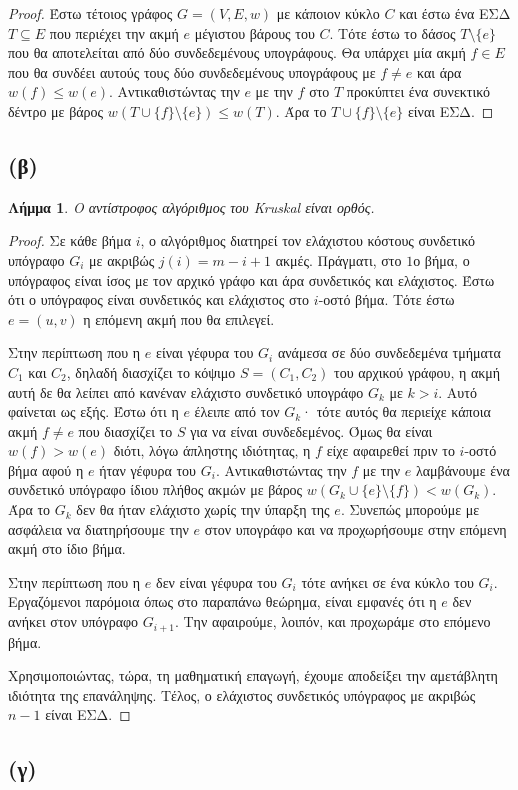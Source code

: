 \documentclass[11pt,a4paper]{book}
\newtheorem*{lemma}{Λήμμα}
\begin{document}
\begin{proof}
Έστω τέτοιος γράφος $G = (V, E, w)$ με κάποιον κύκλο $C$ και έστω ένα ΕΣΔ $T \subseteq E$ που περιέχει την ακμή $e$ μέγιστου βάρους του $C$. Τότε έστω το δάσος $T \setminus \{ e \}$ που θα αποτελείται από δύο συνδεδεμένους υπογράφους. Θα υπάρχει μία ακμή $f \in E$ που θα συνδέει αυτούς τους δύο συνδεδεμένους υπογράφους με $f \neq e$ και άρα $w( f ) \leq w( e )$. Αντικαθιστώντας την $e$ με την $f$ στο $T$ προκύπτει ένα συνεκτικό δέντρο με βάρος $w( T \cup \{ f \} \setminus \{ e \} ) \leq w( T )$. Άρα το $T \cup \{ f \} \setminus \{ e \}$ είναι ΕΣΔ.
\end{proof}

\subsection*{(β)}
\begin{lemma}
Ο αντίστροφος αλγόριθμος του \textlatin{Kruskal} είναι ορθός.
\end{lemma}

\begin{proof}
Σε κάθε βήμα $i$, ο αλγόριθμος διατηρεί τον ελάχιστου κόστους συνδετικό υπόγραφο $G_i$ με ακριβώς $j(i) = m - i + 1$ ακμές. Πράγματι, στο $1$ο βήμα, ο υπόγραφος είναι ίσος με τον αρχικό γράφο και άρα συνδετικός και ελάχιστος. Έστω ότι ο υπόγραφος είναι συνδετικός και ελάχιστος στο $i$-οστό βήμα. Τότε έστω $e = (u, v)$ η επόμενη ακμή που θα επιλεγεί.

Στην περίπτωση που η $e$ είναι γέφυρα του $G_i$ ανάμεσα σε δύο συνδεδεμένα τμήματα $C_1$ και $C_2$, δηλαδή διασχίζει το κόψιμο $S = ( C_1, C_2 )$ του αρχικού γράφου, η ακμή αυτή δε θα λείπει από κανέναν ελάχιστο συνδετικό υπογράφο $G_k$ με $k > i$. Αυτό φαίνεται ως εξής. Έστω ότι η $e$ έλειπε από τον $G_k$· τότε αυτός θα περιείχε κάποια ακμή $f \neq e$ που διασχίζει το $S$ για να είναι συνδεδεμένος. Όμως θα είναι $w(f) > w(e)$ διότι, λόγω άπληστης ιδιότητας, η $f$ είχε αφαιρεθεί πριν το $i$-οστό βήμα αφού η $e$ ήταν γέφυρα του $G_i$. Αντικαθιστώντας την $f$ με την $e$ λαμβάνουμε ένα συνδετικό υπόγραφο ίδιου πλήθος ακμών με βάρος $w( G_k \cup \{ e \} \setminus \{ f \} ) < w( G_k )$. Άρα το $G_k$ δεν θα ήταν ελάχιστο χωρίς την ύπαρξη της $e$. Συνεπώς μπορούμε με ασφάλεια να διατηρήσουμε την $e$ στον υπογράφο και να προχωρήσουμε στην επόμενη ακμή στο ίδιο βήμα.

Στην περίπτωση που η $e$ δεν είναι γέφυρα του $G_i$ τότε ανήκει σε ένα κύκλο του $G_i$. Εργαζόμενοι παρόμοια όπως στο παραπάνω θεώρημα, είναι εμφανές ότι η $e$ δεν ανήκει στον υπόγραφο $G_{i+1}$. Την αφαιρούμε, λοιπόν, και προχωράμε στο επόμενο βήμα.

Χρησιμοποιώντας, τώρα, τη μαθηματική επαγωγή, έχουμε αποδείξει την αμετάβλητη ιδιότητα της επανάληψης. Τέλος, ο ελάχιστος συνδετικός υπόγραφος με ακριβώς $n - 1$ είναι ΕΣΔ.
\end{proof}

\subsection*{(γ)}
\end{document}
